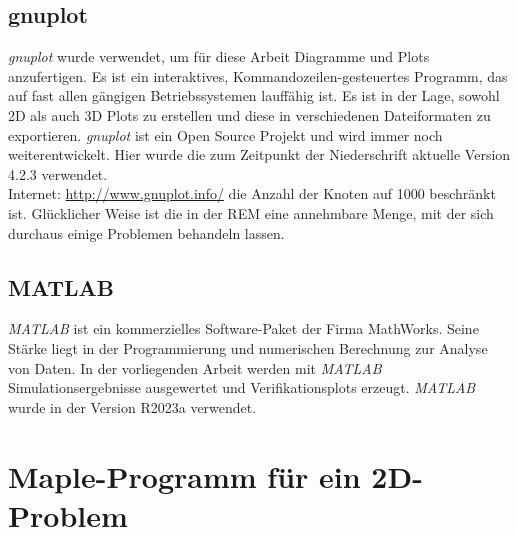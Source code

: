 \subsection{gnuplot}
\emph{gnuplot} wurde verwendet, um für diese Arbeit Diagramme und Plots anzufertigen. Es ist ein interaktives, Kommandozeilen-gesteuertes Programm, das auf fast allen gängigen Betriebssystemen lauffähig ist. Es ist in der Lage, sowohl 2D als auch 3D Plots zu erstellen und diese in verschiedenen Dateiformaten zu exportieren. \emph{gnuplot} ist ein Open Source Projekt und wird immer noch weiterentwickelt. Hier wurde die zum Zeitpunkt der Niederschrift aktuelle Version 4.2.3 verwendet.\\
Internet: \url{http://www.gnuplot.info/}
die Anzahl der Knoten auf 1000 beschränkt ist. Glücklicher Weise ist die in der REM eine annehmbare Menge, mit der sich durchaus einige Problemen behandeln lassen.

\subsection{MATLAB}
\emph{MATLAB\texttrademark} ist ein kommerzielles Software-Paket der Firma MathWorks.
Seine Stärke liegt in der Programmierung und numerischen Berechnung zur Analyse von Daten.
In der vorliegenden Arbeit werden mit \emph{MATLAB\texttrademark} Simulationsergebnisse ausgewertet und Verifikationsplots erzeugt.
\emph{MATLAB\texttrademark} wurde in der Version R2023a verwendet.


\clearpage

\section{Maple\texttrademark -Programm für ein 2D-Problem}
\label{sec:maplecode}

%
  

%
%  
%

